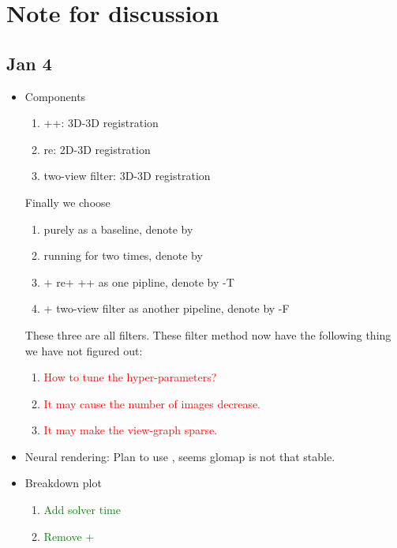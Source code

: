 
\section{Note for discussion}
\label{sec:note}

\subsection{Jan 4}

\begin{itemize}
    \item Components
    \begin{enumerate}
        \item \teaser++: 3D-3D registration
        \item re\ransac: 2D-3D registration
        \item \glomap two-view filter: 3D-3D registration
    \end{enumerate}
    Finally we choose 
    \begin{enumerate}
        \item \nameshort purely as a baseline, denote by \nameshort
        \item \nameshort running for two times, denote by \xmdouble
        \item \xmdouble + re\ransac + \teaser++ as one pipline, denote by \xmdouble-T
        \item \xmdouble + \glomap two-view filter as another pipeline, denote by \xmdouble-F
    \end{enumerate}
    These three are all filters. These filter method now have the following thing we have not figured out:
    \begin{enumerate}[label={\checkmark}]
        \item \textcolor{red}{How to tune the hyper-parameters?}
        \item \textcolor{red}{It may cause the number of images decrease.}
        \item \textcolor{red}{It may make the view-graph sparse.}
    \end{enumerate}
    \item Neural rendering:
    Plan to use \colmap, seems glomap is not that stable.
    \item Breakdown plot
    \begin{enumerate}[label={\checkmark}]
        \item \textcolor{green}{Add solver time}
        \item \textcolor{green}{Remove \teaser + \ransac}

\end{enumerate}
\end{itemize}

